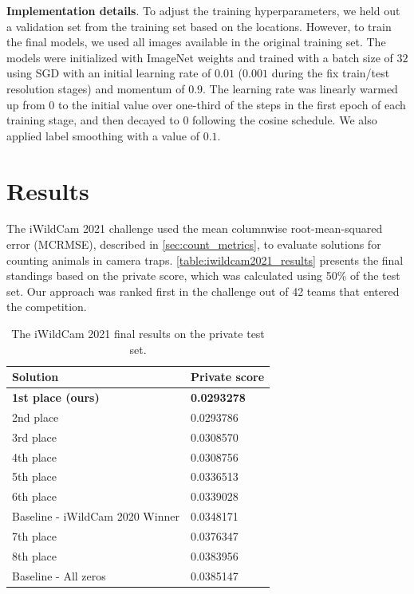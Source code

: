 \textbf{Implementation details}. To adjust the training hyperparameters, we
held out a validation set from the training set based on the locations.
However, to train the final models, we used all images available in the
original training set. The models were initialized with ImageNet weights and
trained with a batch size of $32$ using SGD with an initial learning rate of
$0.01$ ($0.001$ during the fix train/test resolution stages) and momentum of
$0.9$. The learning rate was linearly warmed up from $0$ to the initial value
over one-third of the steps in the first epoch of each training stage, and then
decayed to $0$ following the cosine schedule. We also applied label smoothing
with a value of $0.1$.

\section{Results}

The iWildCam 2021 challenge used the mean columnwise root-mean-squared error
(MCRMSE), described in \autoref{sec:count_metrics}, to evaluate solutions for
counting animals in camera traps. \autoref{table:iwildcam2021_results} presents
the final standings based on the private score, which was calculated using 50\%
of the test set. Our approach was ranked first in the challenge out of 42 teams
that entered the competition.

\begin{table}[htb]
\caption{The iWildCam 2021 final results on the private test set.}
\label{table:iwildcam2021_results}
\begin{center}
\begin{tabular}{ll}
\hline
\textbf{Solution}    & \textbf{Private score} \\ \hline
\textbf{1st place (ours)}        & \textbf{0.0293278}     \\
2nd place             & 0.0293786              \\
3rd place             & 0.0308570              \\
4th place             & 0.0308756              \\
5th place             & 0.0336513              \\
6th place             & 0.0339028              \\
Baseline - iWildCam 2020 Winner  & 0.0348171              \\
7th place             & 0.0376347              \\
8th place             & 0.0383956              \\
Baseline - All zeros             & 0.0385147              \\ \hline
\end{tabular}
\end{center}
\end{table}

